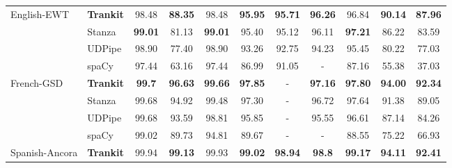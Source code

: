 \documentclass[11pt,a4paper]{article}
\begin{document}
\begin{table*}[ht]
{\begin{tabular}{l|l|c|c|c|c|c|c|c|c|c}
\multirow{4}{*}{English-EWT}            & {\bf Trankit}                     & 98.48          & \textbf{88.35} & 98.48          & \textbf{95.95} & \textbf{95.71} & \textbf{96.26} & 96.84          & \textbf{90.14} & \textbf{87.96} \\ \cline{2-11} 
                                        & Stanza                      & \textbf{99.01} & 81.13          & \textbf{99.01} & 95.40          & 95.12          & 96.11          & \textbf{97.21} & 86.22          & 83.59          \\ \cline{2-11} 
                                        & UDPipe                      & 98.90          & 77.40          & 98.90          & 93.26          & 92.75          & 94.23          & 95.45          & 80.22          & 77.03          \\ \cline{2-11} 
                                        & spaCy   & 97.44                               & 63.16                               & 97.44                               & 86.99                               & 91.05                               & -                                   & 87.16                               & 55.38                               & 37.03                               \\ \hline
\multirow{4}{*}{French-GSD}             & {\bf Trankit}                     & \textbf{99.7}  & \textbf{96.63} & \textbf{99.66} & \textbf{97.85} & -              & \textbf{97.16} & \textbf{97.80} & \textbf{94.00} & \textbf{92.34} \\ \cline{2-11} 
                                        & Stanza                      & 99.68          & 94.92          & 99.48          & 97.30          & -              & 96.72          & 97.64          & 91.38          & 89.05          \\ \cline{2-11} 
                                        & UDPipe                      & 99.68          & 93.59          & 98.81          & 95.85          & -              & 95.55          & 96.61          & 87.14          & 84.26          \\ \cline{2-11} 
                                        & spaCy   & 99.02                               & 89.73                               & 94.81                               & 89.67                               & -                                   & -                                   & 88.55                               & 75.22                               & 66.93                               \\ \hline
\multirow{4}{*}{Spanish-Ancora}         & {\bf Trankit}                     & 99.94          & \textbf{99.13} & 99.93          & \textbf{99.02} & \textbf{98.94} & \textbf{98.8}  & \textbf{99.17} & \textbf{94.11} & \textbf{92.41} \\ \cline{2-11} 

\end{tabular}}
\end{table*}
\end{document}
